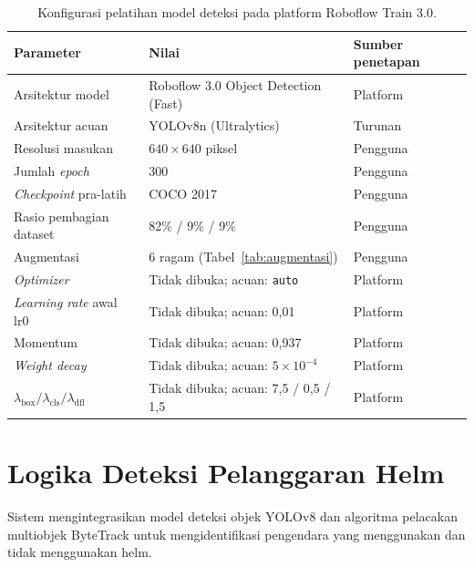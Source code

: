 \begin{table}[H]
\centering
\caption{Konfigurasi pelatihan model deteksi pada platform Roboflow Train 3.0.}
\label{tab:hyperparameter-pelatihan}
\begin{tabular}{lll}
\hline
\textbf{Parameter} & \textbf{Nilai} & \textbf{Sumber penetapan} \\
\hline
Arsitektur model           & Roboflow 3.0 Object Detection (Fast)             & Platform \\
Arsitektur acuan           & YOLOv8n (Ultralytics)                             & Turunan \\
Resolusi masukan           & $640 \times 640$ piksel                            & Pengguna \\
Jumlah \textit{epoch}      & 300                                                & Pengguna \\
\textit{Checkpoint} pra-latih & COCO 2017                                       & Pengguna \\
Rasio pembagian dataset    & 82\% / 9\% / 9\%                                  & Pengguna \\
Augmentasi                 & 6 ragam (Tabel~\ref{tab:augmentasi})              & Pengguna \\
\textit{Optimizer}         & Tidak dibuka; acuan: \texttt{auto}                & Platform \\
\textit{Learning rate} awal $\text{lr0}$ & Tidak dibuka; acuan: 0,01              & Platform \\
Momentum                   & Tidak dibuka; acuan: 0,937                        & Platform \\
\textit{Weight decay}      & Tidak dibuka; acuan: $5 \times 10^{-4}$           & Platform \\
$\lambda_{\text{box}} / \lambda_{\text{cls}} / \lambda_{\text{dfl}}$ & Tidak dibuka; acuan: 7,5 / 0,5 / 1,5 & Platform \\
\hline
\end{tabular}
\end{table}

\section{Logika Deteksi Pelanggaran Helm}
\label{sec:logika-deteksi}

Sistem mengintegrasikan model deteksi objek YOLOv8 dan algoritma pelacakan multiobjek ByteTrack untuk mengidentifikasi pengendara yang menggunakan dan tidak menggunakan helm.

